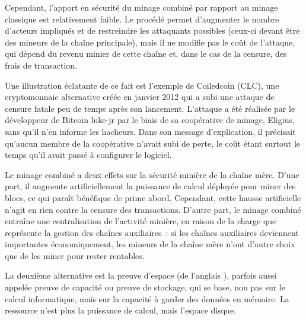 Cependant, l'apport en sécurité du minage combiné par rapport au minage classique est relativement faible. Le procédé permet d'augmenter le nombre d'acteurs impliqués et de restreindre les attaquants possibles (ceux-ci devant être des mineurs de la chaîne principale), mais il ne modifie pas le coût de l'attaque, qui dépend du revenu minier de cette chaîne et, dans le cas de la censure, des frais de transaction.

Une illustration éclatante de ce fait est l'exemple de Coiledcoin (CLC), une cryptomonnaie alternative créée en janvier 2012 qui a subi une attaque de censure fatale peu de temps après son lancement. L'attaque a été réalisée par le développeur de Bitcoin luke-jr par le biais de sa coopérative de minage, Eligius, sans qu'il n'en informe les hacheurs. Dans son message d'explication, il précisait qu'aucun membre de la coopérative n'avait subi de perte, le coût étant surtout le temps qu'il avait passé à configurer le logiciel.

Le minage combiné a deux effets sur la sécurité minière de la chaîne mère. D'une part, il augmente artificiellement la puissance de calcul déployée pour miner des blocs, ce qui paraît bénéfique de prime abord. Cependant, cette hausse artificielle n'agit en rien contre la censure des transactions. D'autre part, le minage combiné entraîne une centralisation de l'activité minière, en raison de la charge que représente la gestion des chaînes auxiliaires~: si les chaînes auxiliaires deviennent importantes économiquement, les mineurs de la chaîne mère n'ont d'autre choix que de les miner pour rester rentables.



La deuxième alternative est la preuve d'espace (de l'anglais ), parfois aussi appelée preuve de capacité ou preuve de stockage, qui se base, non pas sur le calcul informatique, mais sur la capacité à garder des données en mémoire. La ressource n'est plus la puissance de calcul, mais l'espace disque.

